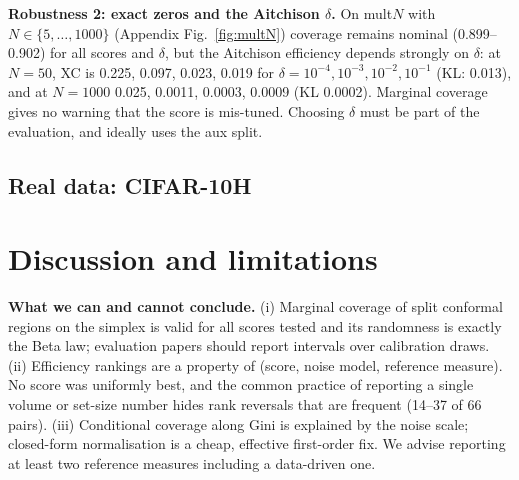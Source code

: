 \documentclass{article}
\begin{document}
\textbf{Robustness 2: exact zeros and the Aitchison $\delta$.} On mult$N$ with $N\in\{5,\dots,1000\}$ (Appendix Fig.~\ref{fig:multN}) coverage remains nominal (0.899--0.902) for all scores and $\delta$, but the Aitchison efficiency depends strongly on $\delta$: at $N=50$, XC is 0.225, 0.097, 0.023, 0.019 for $\delta=10^{-4},10^{-3},10^{-2},10^{-1}$ (KL: 0.013), and at $N=1000$ 0.025, 0.0011, 0.0003, 0.0009 (KL 0.0002). Marginal coverage gives no warning that the score is mis-tuned. Choosing $\delta$ must be part of the evaluation, and ideally uses the aux split.

\subsection{Real data: CIFAR-10H}\label{sec:cifar}


\section{Discussion and limitations}\label{sec:disc}
\textbf{What we can and cannot conclude.} (i) Marginal coverage of split conformal regions on the simplex is valid for all scores tested and its randomness is exactly the Beta law; evaluation papers should report intervals over calibration draws. (ii) Efficiency rankings are a property of (score, noise model, reference measure). No score was uniformly best, and the common practice of reporting a single volume or set-size number hides rank reversals that are frequent (14--37 of 66 pairs). (iii) Conditional coverage along Gini is explained by the noise scale; closed-form normalisation is a cheap, effective first-order fix. We advise reporting at least two reference measures including a data-driven one.
\end{document}
